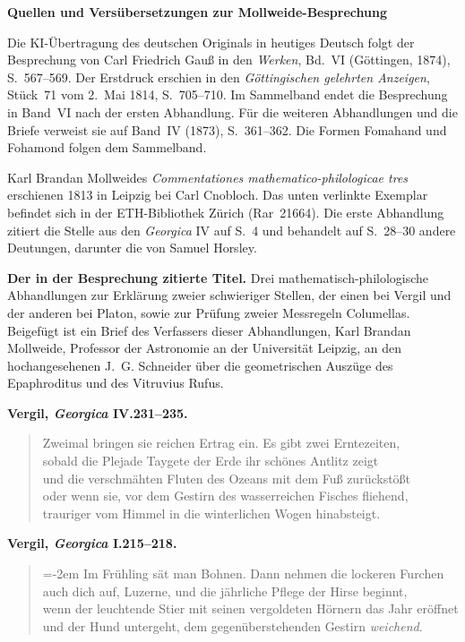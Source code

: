 \clearpage\thispagestyle{empty}
\begin{center}\Large\bfseries Quellen und Versübersetzungen zur Mollweide-Besprechung\end{center}

Die KI-Übertragung des deutschen Originals in heutiges Deutsch folgt der Besprechung von Carl Friedrich Gauß in den \emph{Werken}, Bd.~VI (Göttingen, 1874), S.~567--569. Der Erstdruck erschien in den \emph{Göttingischen gelehrten Anzeigen}, Stück~71 vom 2.~Mai 1814, S.~705--710. Im Sammelband endet die Besprechung in Band~VI nach der ersten Abhandlung. Für die weiteren Abhandlungen und die Briefe verweist sie auf Band~IV (1873), S.~361--362. Die Formen Fomahand und Fohamond folgen dem Sammelband.

Karl Brandan Mollweides \emph{Commentationes mathematico-philologicae tres} erschienen 1813 in Leipzig bei Carl Cnobloch. Das unten verlinkte Exemplar befindet sich in der ETH-Bibliothek Zürich (Rar~21664). Die erste Abhandlung zitiert die Stelle aus den \emph{Georgica} IV auf S.~4 und behandelt auf S.~28--30 andere Deutungen, darunter die von Samuel Horsley.

\noindent\textbf{Der in der Besprechung zitierte Titel.} Drei mathematisch-philologische Abhandlungen zur Erklärung zweier schwieriger Stellen, der einen bei Vergil und der anderen bei Platon, sowie zur Prüfung zweier Messregeln Columellas. Beigefügt ist ein Brief des Verfassers dieser Abhandlungen, Karl Brandan Mollweide, Professor der Astronomie an der Universität Leipzig, an den hochangesehenen J.~G. Schneider über die geometrischen Auszüge des Epaphroditus und des Vitruvius Rufus.

\noindent\textbf{Vergil, \emph{Georgica} IV.231--235.}
\begin{quote}\small Zweimal bringen sie reichen Ertrag ein. Es gibt zwei Erntezeiten,\\
sobald die Plejade Taygete der Erde ihr schönes Antlitz zeigt\\
und die verschmähten Fluten des Ozeans mit dem Fuß zurückstößt\\
oder wenn sie, vor dem Gestirn des wasserreichen Fisches fliehend,\\
trauriger vom Himmel in die winterlichen Wogen hinabsteigt.\end{quote}

\noindent\textbf{Vergil, \emph{Georgica} I.215--218.}
\begin{quote}\small\rightskip=-2em Im Frühling sät man Bohnen. Dann nehmen die lockeren Furchen\\
auch dich auf, Luzerne, und die jährliche Pflege der Hirse beginnt,\\
wenn der leuchtende Stier mit seinen vergoldeten Hörnern das Jahr eröffnet\\
und der Hund untergeht, dem gegenüberstehenden Gestirn \emph{weichend}.\end{quote}

